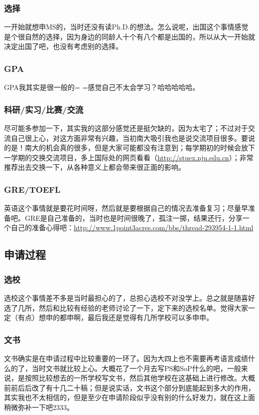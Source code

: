 \documentclass[a4paper,UTF8]{book}
\begin{document}
        \subsubsection*{选择}
        一开始就想申MS的，当时还没有读Ph.D.的想法。怎么说呢，出国这个事情感觉是个很自然的选择，因为身边的同龄人十个有八个都是出国的，所以从大一开始就决定出国了吧，也没有考虑别的选择。

        \subsubsection*{GPA}
        GPA我其实是很一般的= =感觉自己不太会学习？哈哈哈哈哈。

        \subsubsection*{科研/实习/比赛/交流}
        尽可能多参加一下，其实我的这部分感觉还是挺欠缺的，因为太宅了；不过对于交流自己很上心，对这方面非常有兴趣，当初南大吸引我也是说交流项目很多。要说的是！南大的机会真的很多，但是大家可能都没有注意到；每学期初的时候会放下一学期的交换交流项目，多上国际处的网页看看（\url{http://stuex.nju.edu.cn}）；非常推荐出去交换一下，从各种意义上都会带来很正面的影响。

        \subsubsection*{GRE/TOEFL}
        英语这个事情就是要花时间呀，然后就是要根据自己的情况去准备复习；尽量早准备吧。GRE是自己准备的，当时也是时间很晚了，孤注一掷，结果还行，分享一个自己的准备心得吧：\url{http://www.1point3acres.com/bbs/thread-293954-1-1.html}

    \subsection*{申请过程}
        \subsubsection*{选校}
        选校这个事情差不多是当时最担心的了，总担心选校不对没学上。总之就是随喜好选了几所，然后和比较有经验的老师讨论了一下，定下来的选校名单。觉得大家一定（有点）想申的都申啊，最后我还是觉得有几所学校可以多申申。

        \subsubsection*{文书}
        文书确实是在申请过程中比较重要的一环了。因为大四上也不需要再考语言成绩什么的了，当时文书就比较上心。大概花了一个月去写PS和SoP什么的吧，一般来说，是按照比较想去的一所学校写文书，然后其他学校在这基础上进行修改。大概前前后后改了有十几二十稿；但是说实话，文书这个部分到底能起到多大的作用，其实我也不太相信的，但是至少在申请阶段似乎没有别的什么好发力，就在这上面稍微弥补一下吧2333。
\end{document}
